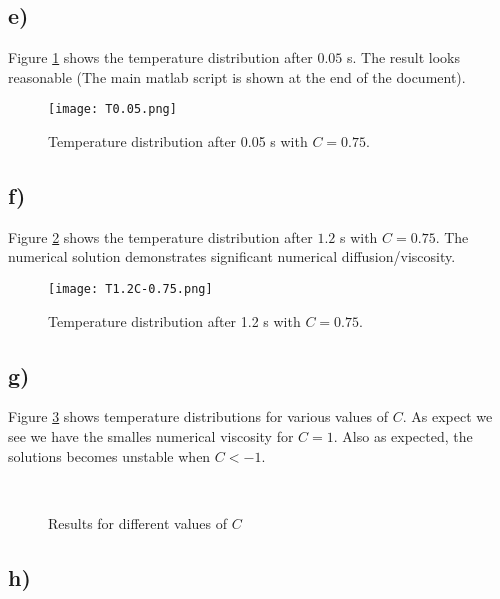 \documentclass{article}
\begin{document}
\subsection{e)}
Figure \ref{fig:test} shows the temperature distribution after $0.05$ s. The result looks reasonable (The main matlab script is shown at the end of the document).

\begin{figure}
	\texttt{[image: T0.05.png]}
	
	\caption{Temperature distribution after 0.05 s with $C =0.75$.}
	\label{fig:test}
\end{figure}

\subsection{f)}

Figure \ref{fig:TC075} shows the temperature distribution after $1.2$ s with $C = 0.75$. The numerical solution demonstrates significant numerical diffusion/viscosity.

\begin{figure}
	\texttt{[image: T1.2C-0.75.png]}	
	\caption{Temperature distribution after 1.2 s with $C =0.75$.}
	\label{fig:TC075}
\end{figure}

\subsection{g)}
Figure \ref{fig:diffc} shows temperature distributions for various values of $C$. As expect we see we have the smalles numerical viscosity for $C = 1$. Also as expected, the solutions becomes unstable when $C<-1$.

\begin{figure}
	 \\
	\caption{Results for different values of $C$}
	\label{fig:diffc}
\end{figure}

\subsection{h)}
\end{document}
